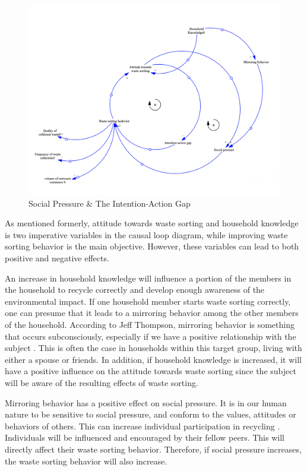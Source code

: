 \begin{figure}[H]
\centering
\includegraphics [scale=0.30,angle=360]{figures/socialpressure.png}
\caption{Social Pressure \& The Intention-Action Gap}
\label{fig:Social Pressure}
\end{figure}

\indent \newline
As mentioned formerly, attitude towards waste sorting and household knowledge is two imperative variables in the causal loop diagram, while improving waste sorting behavior is the main objective. However, these variables can lead to both positive and negative effects. 

\indent \newline
An increase in household knowledge will influence a portion of the members in the household to recycle correctly and develop enough awareness of the environmental impact. If one household member starts waste sorting correctly, one can presume that it leads to a mirroring behavior among the other members of the household. According to Jeff Thompson, mirroring behavior is something that occurs subconsciously, especially if we have a positive relationship with the subject \cite{mimicry}. This is often the case in households within this target group, living with either a spouse or friends. In addition, if household knowledge is increased, it will have a positive influence on the attitude towards waste sorting since the subject will be aware of the resulting effects of waste sorting.

\indent \newline
Mirroring behavior has a positive effect on social pressure. It is in our human nature to be sensitive to social pressure, and conform to the values, attitudes or behaviors of others. This can increase individual participation in recycling \cite{shackel}. Individuals will be influenced and encouraged by their fellow peers. This will directly affect their waste sorting behavior. Therefore, if social pressure increases, the waste sorting behavior will also increase.  

